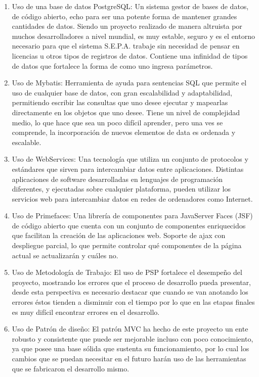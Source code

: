 \documentclass[a4paper,12pt,openany,oneside]{book}
\begin{document}
\begin{enumerate}
        \item Uso de una base de datos PostgreSQL: Un sistema gestor de bases de datos, de código abierto, echo para ser una potente forma de mantener grandes cantidades de datos. Siendo un proyecto realizado de manera altruista por muchos desarrolladores a nivel mundial, es muy estable, seguro y es el entorno necesario para que el sistema S.E.P.A. trabaje sin necesidad de pensar en licencias u otros tipos de registros de datos. Contiene una infinidad de tipos de datos que fortalece la forma de como uno ingresa parámetros.
        \item Uso de Mybatis: Herramienta de ayuda para sentencias SQL que permite el uso de cualquier base de datos, con gran escalabilidad y adaptabilidad, permitiendo escribir las consultas que uno desee ejecutar y mapearlas directamente en los objetos que uno desee. Tiene un nivel de complejidad medio, lo que hace que sea un poco difícil aprender, pero una ves se comprende, la incorporación de nuevos elementos de data es ordenada y escalable.
        \item Uso de WebServices: Una tecnología que utiliza un conjunto de protocolos y estándares que sirven para intercambiar datos entre aplicaciones. Distintas aplicaciones de software desarrolladas en lenguajes de programación diferentes, y ejecutadas sobre cualquier plataforma, pueden utilizar los servicios web para intercambiar datos en redes de ordenadores como Internet.
        \item Uso de Primefaces: Una librería de componentes para JavaServer Faces (JSF) de código abierto que cuenta con un conjunto de componentes enriquecidos que facilitan la creación de las aplicaciones web. Soporte de ajax con despliegue parcial, lo que permite controlar qué componentes de la página actual se actualizarán y cuáles no.
        \item Uso de Metodología de Trabajo: El uso de PSP fortalece el desempeño del proyecto, mostrando los errores que el proceso de desarrollo pueda presentar, desde esta perspectiva es necesario destacar que cuando se van anotando los errores éstos tienden a disminuir con el tiempo por lo que en las etapas finales es muy difícil encontrar errores en el desarrollo.
        \item Uso de Patrón de diseño: El patrón MVC ha hecho de este proyecto un ente robusto y consistente que puede ser mejorable incluso con poco conocimiento, ya que posee una base sólida que sustenta su funcionamiento, por lo cual los cambios que se puedan necesitar en el futuro harán uso de las herramientas que se fabricaron el desarrollo mismo.

\end{enumerate}
\end{document}
